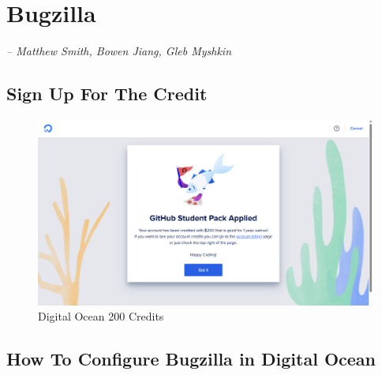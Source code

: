 \chapter{Bugzilla}
\small{\textit{-- Matthew Smith, Bowen Jiang, Gleb Myshkin}}
\label{Chapter Bugzilla}


\section{Sign Up For The Credit }
\begin{figure} [H]
\includegraphics[width=\textwidth]{digital ocean.png}
  \centering
  \caption{Digital Ocean 200 Credits}
  \vspace{-0.3cm}
\end{figure}


\section{How To Configure Bugzilla in Digital Ocean}

